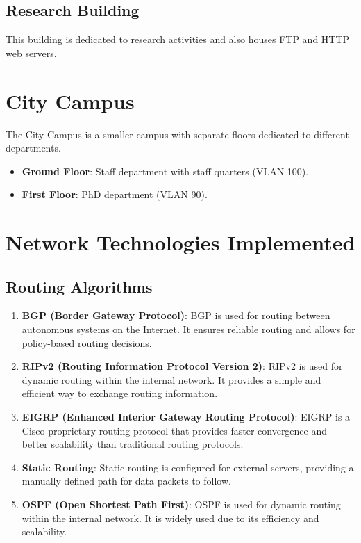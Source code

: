 \documentclass[12pt]{article}
\begin{document}
\subsection{Research Building}
This building is dedicated to research activities and also houses FTP and HTTP web servers.

\section{City Campus}
The City Campus is a smaller campus with separate floors dedicated to different departments.

\begin{itemize}[label=--,leftmargin=*,parsep=0pt,itemsep=4pt]
    \item \textbf{Ground Floor}: Staff department with staff quarters (VLAN 100).
    \item \textbf{First Floor}: PhD department (VLAN 90).
\end{itemize}

\section{Network Technologies Implemented}
\subsection{Routing Algorithms}
\begin{enumerate}
    \item \textbf{BGP (Border Gateway Protocol)}: BGP is used for routing between autonomous systems on the Internet. It ensures reliable routing and allows for policy-based routing decisions.
    \item \textbf{RIPv2 (Routing Information Protocol Version 2)}: RIPv2 is used for dynamic routing within the internal network. It provides a simple and efficient way to exchange routing information.
    \item \textbf{EIGRP (Enhanced Interior Gateway Routing Protocol)}: EIGRP is a Cisco proprietary routing protocol that provides faster convergence and better scalability than traditional routing protocols.
    \item \textbf{Static Routing}: Static routing is configured for external servers, providing a manually defined path for data packets to follow.
    \item \textbf{OSPF (Open Shortest Path First)}: OSPF is used for dynamic routing within the internal network. It is widely used due to its efficiency and scalability.
\end{enumerate}
\end{document}

